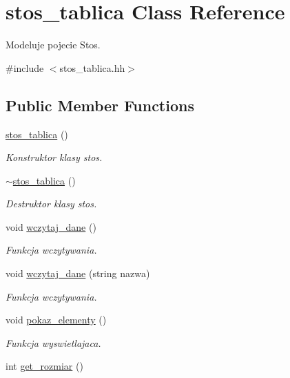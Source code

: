 \hypertarget{classstos__tablica}{\section{stos\-\_\-tablica Class Reference}
\label{classstos__tablica}
}


Modeluje pojecie Stos.  




{\ttfamily \#include $<$stos\-\_\-tablica.\-hh$>$}

\subsection*{Public Member Functions}
\begin{DoxyCompactItemize}
\item 
\hyperlink{classstos__tablica_a7dfdcb1a98f9434a5f94ebc19ac14af5}{stos\-\_\-tablica} ()
\begin{DoxyCompactList}\small\item\em Konstruktor klasy stos. \end{DoxyCompactList}\item 
\hyperlink{classstos__tablica_a684a8f468cb76ecf6c01df66fcbae8f6}{$\sim$stos\-\_\-tablica} ()
\begin{DoxyCompactList}\small\item\em Destruktor klasy stos. \end{DoxyCompactList}\item 
void \hyperlink{classstos__tablica_a68d7d3ed8622663ff7aca3b9696724c5}{wczytaj\-\_\-dane} ()
\begin{DoxyCompactList}\small\item\em Funkcja wczytywania. \end{DoxyCompactList}\item 
void \hyperlink{classstos__tablica_a33b9257de4213c84e96e666898f5ead0}{wczytaj\-\_\-dane} (string nazwa)
\begin{DoxyCompactList}\small\item\em Funkcja wczytywania. \end{DoxyCompactList}\item 
void \hyperlink{classstos__tablica_a89f6cd04da8bafdded7b8d0f003e3978}{pokaz\-\_\-elementy} ()
\begin{DoxyCompactList}\small\item\em Funkcja wyswietlajaca. \end{DoxyCompactList}\item 
int \hyperlink{classstos__tablica_a29bd76c04019f6b149090a8882d54f7b}{get\-\_\-rozmiar} ()

\end{DoxyCompactItemize}
